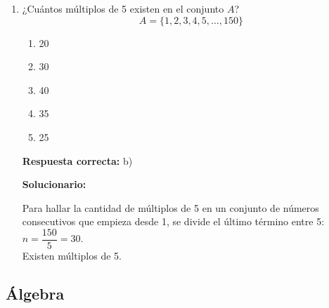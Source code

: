 \begin{enumerate}
	\begin{enumerate}[label=\alph*)]
		\item 8
		\item 4
		\item 10
		\item 5
		\item 12
	\end{enumerate}
	\textbf{Respuesta correcta:} e)
	
	\vspace{2mm}
	\textbf{Solucionario:}
	
	Ha invertido: $48 \times 2 = 96.00$ soles. \\
	Como desea ganar 48 soles, entonces la mezcla se debe vender en $96 + 48 = 144.00$ soles a razón de 2.40 soles el litro.\\
	Luego:\\
	1 litro se vende a 2.40 soles\\
	$x$ litros se vende a 144 soles\\
	$\Rightarrow x = \dfrac{(144)(1)}{2.4} = 60$ litros.\\
	Debe adicionar: $60 - 48 =$
	
	\vspace{6mm}
	
	\item ¿Cuántos múltiplos de 5 existen en el conjunto $A$?
	\[ A = \{1, 2, 3, 4, 5, \dots, 150\} \]
	
	\begin{enumerate}[label=\alph*)]
		\item 20
		\item 30
		\item 40
		\item 35
		\item 25
	\end{enumerate}
	\textbf{Respuesta correcta:} b)
	
	\vspace{2mm}
	\textbf{Solucionario:}
	
	Para hallar la cantidad de múltiplos de 5 en un conjunto de números consecutivos que empieza desde 1, se divide el último término entre 5:\\
	$n = \dfrac{150}{5} = 30$.\\
	Existen  múltiplos de 5.
	
	\vspace{6mm}
	
\end{enumerate}


\subsection*{Álgebra}

